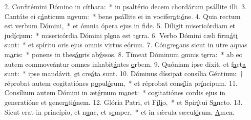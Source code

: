 2. Confitémini Dómino in c\uline{í}th\uline{a}ra:~* in psaltério decem chordárum ps\uline{á}llite \uline{i}lli.
3. Cantáte ei c\uline{á}nticum n\uline{o}vum:~* bene psállite ei in vocifer\uline{a}ti\uline{ó}ne.
4. Quia rectum est verbum D\uline{ó}m\uline{i}ni,~* et ómnia ópera \uline{e}jus in f\uline{i}de.
5. Díligit misericórdiam et jud\uline{í}c\uline{i}um:~* misericórdia Dómini pl\uline{e}na est t\uline{e}rra.
6. Verbo Dómini cæli firm\uline{á}t\uline{i} sunt:~* et spíritu oris ejus omnis v\uline{i}rtus e\uline{ó}rum.
7. Cóngregans sicut in utre \uline{a}quas m\uline{a}ris:~* ponens in thes\uline{áu}ris ab\uline{ý}ssos.
8. Tímeat Dóminum \uline{o}mnis t\uline{e}rra:~* ab eo autem commoveántur omnes inhabit\uline{á}ntes \uline{o}rbem.
9. Quóniam ipse dixit, et f\uline{a}ct\uline{a} sunt:~* ipse mandávit, \uline{e}t cre\uline{á}ta sunt.
10. Dóminus díssipat consília Géntium:~† réprobat autem cogitatiónes p\uline{o}pul\uline{ó}rum,~* et réprobat cons\uline{í}lia pr\uline{í}ncipum.
11. Consílium autem Dómini in æt\uline{é}rnum m\uline{a}net:~* cogitatiónes cordis ejus in generatióne et gener\uline{a}ti\uline{ó}nem.
12. Glória Patri, et F\uline{í}l\uline{i}o,~* et Spir\uline{í}tui S\uline{a}ncto.
13. Sicut erat in princípio, et n\uline{u}nc, et s\uline{e}mper,~* et in sǽcula sæcul\uline{ó}rum. \uline{A}men.
